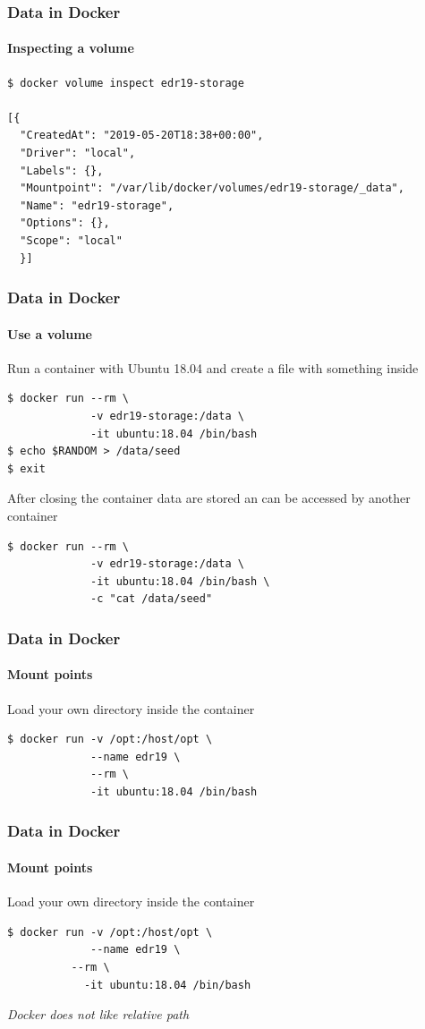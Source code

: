 \begin{frame}[fragile]
\frametitle{Data in Docker}
\framesubtitle{Inspecting a volume}

\begin{lstlisting}
$ docker volume inspect edr19-storage

[{
  "CreatedAt": "2019-05-20T18:38+00:00",
  "Driver": "local",
  "Labels": {},
  "Mountpoint": "/var/lib/docker/volumes/edr19-storage/_data",
  "Name": "edr19-storage",
  "Options": {},
  "Scope": "local"
  }]
\end{lstlisting}

\end{frame}

\begin{frame}[fragile]
\frametitle{Data in Docker}
\framesubtitle{Use a volume}

Run a container with Ubuntu 18.04 and create a file with something inside
\begin{lstlisting}
$ docker run --rm \
             -v edr19-storage:/data \
             -it ubuntu:18.04 /bin/bash 
$ echo $RANDOM > /data/seed
$ exit
\end{lstlisting}

After closing the container data are stored an can be accessed
by another container

\begin{lstlisting}
$ docker run --rm \
             -v edr19-storage:/data \
             -it ubuntu:18.04 /bin/bash \
             -c "cat /data/seed"
\end{lstlisting}
\end{frame}

\begin{frame}[fragile]
\frametitle{Data in Docker}
\framesubtitle{Mount points}

Load your own directory inside the container

\begin{lstlisting}
$ docker run -v /opt:/host/opt \
             --name edr19 \
             --rm \
             -it ubuntu:18.04 /bin/bash
\end{lstlisting}
\end{frame}

\begin{frame}[fragile]
\frametitle{Data in Docker}
\framesubtitle{Mount points}

Load your own directory inside the container

\begin{lstlisting}
$ docker run -v /opt:/host/opt \
             --name edr19 \
	      --rm \
            -it ubuntu:18.04 /bin/bash

\end{lstlisting}

\it{Docker does not like relative path}
\end{frame}

